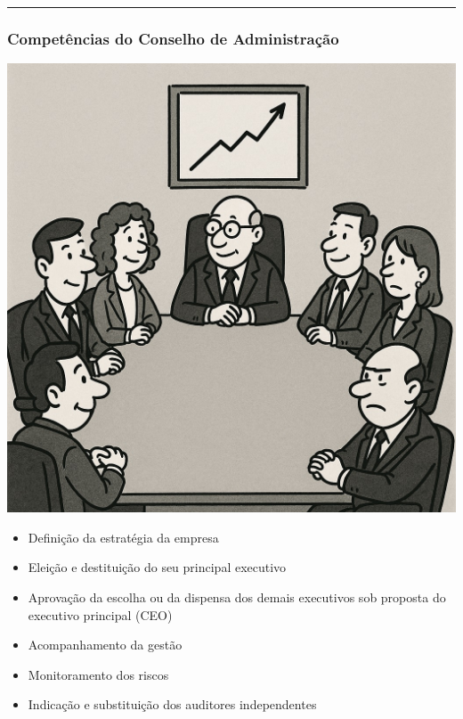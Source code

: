 \documentclass[
]{book}
\providecommand{\tightlist}{%
  \setlength{\itemsep}{0pt}\setlength{\parskip}{0pt}}
\begin{document}
\begin{center}\rule{0.5\linewidth}{0.5pt}\end{center}

\subsubsection{Competências do Conselho de Administração}\label{competuxeancias-do-conselho-de-administrauxe7uxe3o}

\includegraphics{images/04-2025-08-26_27/01-conselho_administrativo.jpg}

\begin{itemize}
\tightlist
\item
  Definição da estratégia da empresa\\
\item
  Eleição e destituição do seu principal executivo\\
\item
  Aprovação da escolha ou da dispensa dos demais executivos sob proposta do executivo principal (CEO)\\
\item
  Acompanhamento da gestão\\
\item
  Monitoramento dos riscos\\
\item
  Indicação e substituição dos auditores independentes
\end{itemize}
\end{document}
